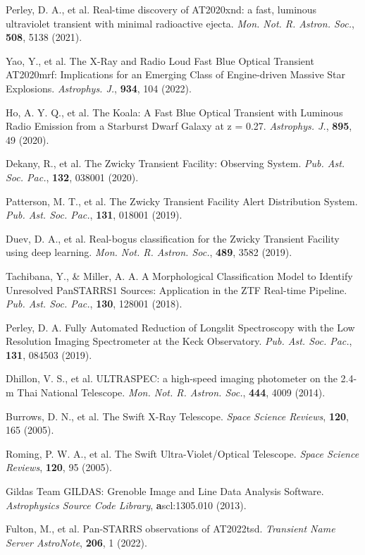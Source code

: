 \documentclass{nature_plusfigure}
\newcommand{\mn}{{Mon. Not. R. Astron. Soc.}}
\newcommand{\mnras}{\mn}
\newcommand{\apj}{{Astrophys. J.}}
\newcommand{\pasp}{{Pub. Ast. Soc. Pac.}}
\newcommand{\ssr}{Space Science Reviews}
\begin{document}
\begin{methods}
\begin{thebibliography}{10}
 Perley, D. A., et al. Real-time discovery of AT2020xnd: a fast, luminous ultraviolet transient with minimal radioactive ejecta. \emph{\mnras}, \textbf{508}, 5138 (2021). 

 Yao, Y., et al. The X-Ray and Radio Loud Fast Blue Optical Transient AT2020mrf: Implications for an Emerging Class of Engine-driven Massive Star Explosions. \emph{\apj}, \textbf{934}, 104 (2022). 

 Ho, A. Y. Q., et al. The Koala: A Fast Blue Optical Transient with Luminous Radio Emission from a Starburst Dwarf Galaxy at z = 0.27. \emph{\apj}, \textbf{895}, 49 (2020). 

  Dekany, R., et al. The Zwicky Transient Facility: Observing System. \emph{\pasp}, \textbf{132}, 038001 (2020). 

 Patterson, M. T., et al. The Zwicky Transient Facility Alert Distribution System. \emph{\pasp}, \textbf{131}, 018001 (2019). 

  Duev, D. A., et al. Real-bogus classification for the Zwicky Transient Facility using deep learning. \emph{\mnras}, \textbf{489}, 3582 (2019). 

 Tachibana, Y., \& Miller, A. A. A Morphological Classification Model to Identify Unresolved PanSTARRS1 Sources: Application in the ZTF Real-time Pipeline. \emph{\pasp}, \textbf{130}, 128001 (2018). 

 Perley, D. A. Fully Automated Reduction of Longslit Spectroscopy with the Low Resolution Imaging Spectrometer at the Keck Observatory. \emph{\pasp}, \textbf{131}, 084503 (2019). 

 Dhillon, V. S., et al. ULTRASPEC: a high-speed imaging photometer on the 2.4-m Thai National Telescope. \emph{\mnras}, \textbf{444}, 4009 (2014). 

 Burrows, D. N., et al. The Swift X-Ray Telescope. \emph{\ssr}, \textbf{120}, 165 (2005). 

 Roming, P. W. A., et al. The Swift Ultra-Violet/Optical Telescope. \emph{\ssr}, \textbf{120}, 95 (2005).

 Gildas Team GILDAS: Grenoble Image and Line Data Analysis Software. \emph{Astrophysics Source Code Library}, \textbf ascl:1305.010 (2013). 

 Fulton, M., et al. Pan-STARRS observations of AT2022tsd. \emph{Transient Name Server AstroNote}, \textbf{206}, 1 (2022). 


\end{thebibliography}
\end{methods}
\end{document}
